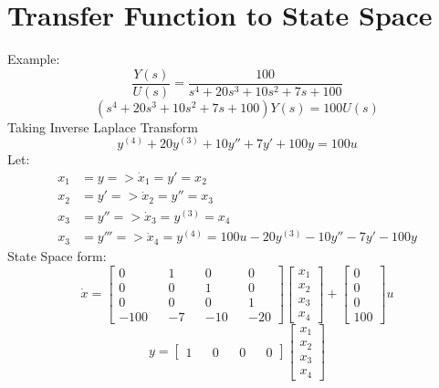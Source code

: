 \documentclass[12pt,a4paper]{article}
\begin{document}
	
	\section{Transfer Function to State Space}
	Example:
	\[\frac{Y(s)}{U(s)} = \frac{100}{s^4 + 20s^3 + 10s^2 + 7s + 100}\]
	\[(s^4 + 20s^3 + 10s^2 + 7s + 100)Y(s) = 100 U(s)\]
	Taking Inverse Laplace Transform
	\[y^{(4)} + 20y^{(3)} + 10 y'' + 7y' + 100y = 100 u\]
	Let:
	\[
	\begin{split}
		x_1 &= y   => \dot{x}_1 = y' = x_2\\
		x_2 &= y'  => \dot{x}_2 = y'' = x_3\\
		x_3 &= y'' => \dot{x}_3 = y^{(3)} = x_4\\
		x_3 &= y'''=> \dot{x}_4 = y^{(4)} = 100u - 20y^{(3)} - 10 y'' - 7y' - 100y
	\end{split}
	\]
	State Space form:
	\[
	\dot{x} = 
	\begin{bmatrix}
		0    &   & 1  &   & 0   &   & 0   \\
		0    &   & 0  &   & 1   &   & 0   \\
		0    &   & 0  &   & 0   &   & 1   \\
		-100 &   & -7 &   & -10 &   & -20 
	\end{bmatrix}
	\begin{bmatrix}
		x_1 \\
		x_2 \\
		x_3 \\
		x_4 
	\end{bmatrix} + 
	\begin{bmatrix}
		0   \\
		0   \\
		0   \\
		100 
	\end{bmatrix} u
	\]
	\[
	y =
	\begin{bmatrix}
		1 &   & 0 &   & 0 &   & 0 
	\end{bmatrix}
	\begin{bmatrix}
		x_1 \\
		x_2 \\
		x_3 \\
		x_4 
	\end{bmatrix}
	\]
	
	
\end{document}
